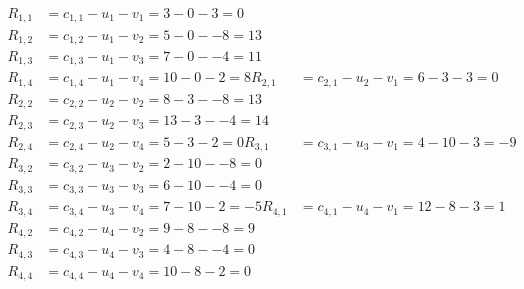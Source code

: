 \[
\begin{aligned}
R_{1,1} &= c_{1,1} - u_{1} - v_{1} = 3 - 0 - 3 = 0 \\
R_{1,2} &= c_{1,2} - u_{1} - v_{2} = 5 - 0 - -8 = 13 \\
R_{1,3} &= c_{1,3} - u_{1} - v_{3} = 7 - 0 - -4 = 11 \\
R_{1,4} &= c_{1,4} - u_{1} - v_{4} = 10 - 0 - 2 = 8 
R_{2,1} &= c_{2,1} - u_{2} - v_{1} = 6 - 3 - 3 = 0 \\
R_{2,2} &= c_{2,2} - u_{2} - v_{2} = 8 - 3 - -8 = 13 \\
R_{2,3} &= c_{2,3} - u_{2} - v_{3} = 13 - 3 - -4 = 14 \\
R_{2,4} &= c_{2,4} - u_{2} - v_{4} = 5 - 3 - 2 = 0 
R_{3,1} &= c_{3,1} - u_{3} - v_{1} = 4 - 10 - 3 = -9 \\
R_{3,2} &= c_{3,2} - u_{3} - v_{2} = 2 - 10 - -8 = 0 \\
R_{3,3} &= c_{3,3} - u_{3} - v_{3} = 6 - 10 - -4 = 0 \\
R_{3,4} &= c_{3,4} - u_{3} - v_{4} = 7 - 10 - 2 = -5 
R_{4,1} &= c_{4,1} - u_{4} - v_{1} = 12 - 8 - 3 = 1 \\
R_{4,2} &= c_{4,2} - u_{4} - v_{2} = 9 - 8 - -8 = 9 \\
R_{4,3} &= c_{4,3} - u_{4} - v_{3} = 4 - 8 - -4 = 0 \\
R_{4,4} &= c_{4,4} - u_{4} - v_{4} = 10 - 8 - 2 = 0 
\end{aligned}
\]

